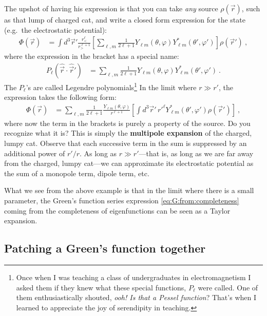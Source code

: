 \begin{example}
The upshot of having his expression is that you can take \emph{any} source $\rho(\vec{r})$, such as that lump of charged cat, and write a closed form expression for the state (e.g.\ the electrostatic potential):
\begin{align}
	\Phi(\vec{r})
	&=
	\int d^3 \vec{r}'
	\frac{r_<^\ell}{r_>^{\ell+1}}
	\left[
		\sum_{\ell, m}
		\frac{1}{2\ell+1}
		Y_{\ell m}(\theta, \varphi)
		Y_{\ell m}^*(\theta', \varphi')
	\right]
	\rho(\vec{r}') \ ,
\end{align}
where the expression in the bracket has a special name:
\begin{align}
	P_\ell(\hat{\vec{r}}\cdot\hat{\vec{r}}')
	&=
	\sum_{\ell, m}
		\frac{1}{2\ell+1}
		Y_{\ell m}(\theta, \varphi)
		Y_{\ell m}^*(\theta', \varphi') \ .
\end{align}
The $P_\ell$'s are called Legendre polynomials\footnote{Once when I was teaching a class of undergraduates in electromagnetism I asked them if they knew what these special functions, $P_\ell$ were called. One of them enthusiastically shouted, \emph{ooh! Is that a Pessel function}? That's when I learned to appreciate the joy of serendipity in teaching.} In the limit where $r\gg r'$, the expression takes the following form:
\begin{align}
	\Phi(\vec{r})
	&=
	\sum_{\ell, m}
	\frac{1}{2\ell+1}
	\frac{Y_{\ell m}(\theta, \varphi)}{r^{\ell+1}}
	\left[\int d^3 \vec{r}'
	 	 	\, r'^{\ell}
	 	 		Y_{\ell m}^*(\theta', \varphi')
	 	 		\rho(\vec{r}')\right] \ ,
\end{align}
where now the term in the brackets is purely a property of the source. Do you recognize what it is? This is simply the \textbf{multipole expansion} of the charged, lumpy cat. Observe that each successive term in the sum is suppressed by an additional power of $r'/r$. As long as $r\gg r'$---that is, as long as we are far away from the charged, lumpy cat---we can approximate its electrostatic potential as the sum of a monopole term, dipole term, etc. 
\end{example}
What we see from the above example is that in the limit where there is a small parameter, the Green's function series expression \eqref{eq:G:from:completeness} coming from the completeness of eigenfunctions can be seen as a Taylor expansion.

\subsection{Patching a Green's function together}
\label{sec:patching}

